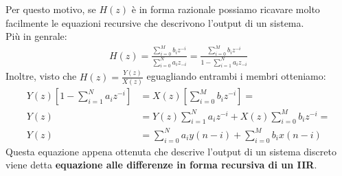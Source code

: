 Per questo motivo, se $H(z)$ è in forma razionale possiamo ricavare molto facilmente le equazioni recursive che descrivono l'output di un sistema.\\
Più in genrale:
\begin{align*}
    H(z) = \frac{\sum_{i = 0}^{M}b_iz^{-i}}{\sum_{i = 0}^{N}a_iz_{-i}} = \frac{\sum_{i = 0}^{M}b_iz^{-i}}{1 - \sum_{i = 1}^{N}a_iz_{-i}}
\end{align*}
Inoltre, visto che $H(z) = \frac{Y(z)}{X(z)}$ eguagliando entrambi i membri otteniamo:
\begin{align*}
    Y(z)\left[1 - \sum_{i = 1}^{N} a_iz^{-i}\right] &= X(z)\left[\sum_{i = 0}^{M} b_iz^{-i}\right] =\\
    Y(z) &= Y(z)\sum_{i = 1}^{N} a_iz^{-i} + X(z)\sum_{i = 0}^{M}b_iz^{-i}=\\
    Y(z) &= \sum_{i = 0}^{N} a_iy(n - i) + \sum_{i = 0}^{M} b_ix(n - i)
\end{align*}
Questa equazione appena ottenuta che descrive l'output di un sistema discreto viene detta \textbf{equazione alle differenze in forma recursiva di un IIR}.